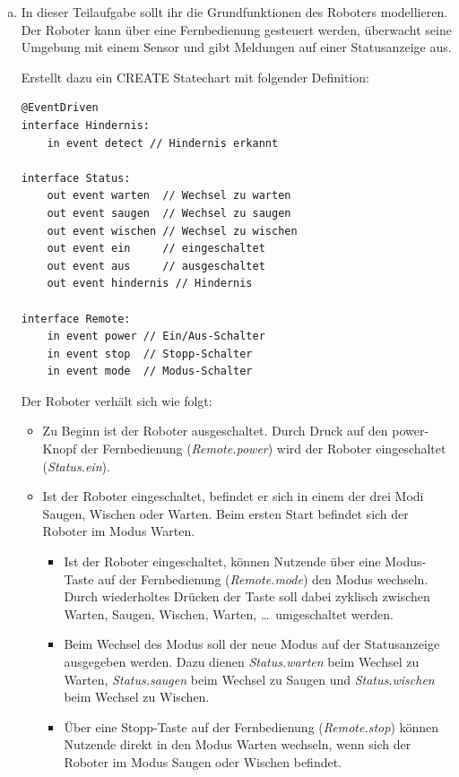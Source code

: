\begin{enumerate}[a)] 
\item In dieser Teilaufgabe sollt ihr die Grundfunktionen des Roboters modellieren.
Der Roboter kann über eine Fernbedienung gesteuert werden, überwacht seine Umgebung mit einem Sensor und gibt
Meldungen auf einer Statusanzeige aus.

Erstellt dazu ein CREATE Statechart mit folgender Definition:

\begin{lstlisting}
@EventDriven
interface Hindernis:
    in event detect // Hindernis erkannt

interface Status:
    out event warten  // Wechsel zu warten
    out event saugen  // Wechsel zu saugen
    out event wischen // Wechsel zu wischen
    out event ein     // eingeschaltet
    out event aus     // ausgeschaltet
    out event hindernis // Hindernis

interface Remote:
    in event power // Ein/Aus-Schalter
    in event stop  // Stopp-Schalter
    in event mode  // Modus-Schalter
\end{lstlisting}

Der Roboter verhält sich wie folgt:

\begin{itemize}
\item Zu Beginn ist der Roboter ausgeschaltet. Durch Druck auf den power-Knopf der Fernbedienung
(\textit{Remote.power}) wird der Roboter eingeschaltet (\textit{Status.ein}).

\item Ist der Roboter eingeschaltet, befindet er sich in einem der drei Modi Saugen, Wischen oder Warten.
Beim ersten Start befindet sich der Roboter im Modus Warten.
  \begin{itemize}
  \item Ist der Roboter eingeschaltet, können Nutzende über eine Modus-Taste auf der Fernbedienung
  (\textit{Remote.mode}) den Modus wechseln. Durch wiederholtes Drücken der Taste soll dabei zyklisch zwischen
  Warten, Saugen, Wischen, Warten, \dots\ umgeschaltet werden.

  \item Beim Wechsel des Modus soll der neue Modus auf der Statusanzeige ausgegeben werden. Dazu dienen
  \textit{Status.warten} beim Wechsel zu Warten, \textit{Status.saugen} beim Wechsel zu Saugen und
  \textit{Status.wischen} beim Wechsel zu Wischen.

  \item Über eine Stopp-Taste auf der Fernbedienung (\textit{Remote.stop}) können Nutzende direkt in den Modus
  Warten wechseln, wenn sich der Roboter im Modus Saugen oder Wischen befindet.
  \end{itemize}


\end{itemize}
\end{enumerate}
